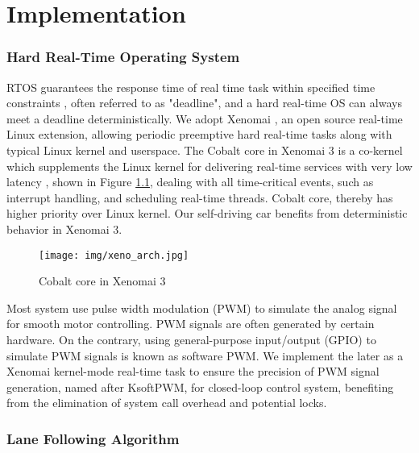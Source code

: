 \newpage
{}
\chapter{Implementation}
\pagestyle{plain}

\begin{spacing}{2.0}

\subsection{Hard Real-Time Operating System}

RTOS guarantees the response time of real time task within specified time constraints \cite{RTOS}, often referred to as "deadline", and a hard real-time OS can always meet a deadline deterministically. We adopt Xenomai \cite{Xenomai}, an open source real-time Linux extension, allowing periodic preemptive hard real-time tasks along with typical Linux kernel and userspace. The Cobalt core in Xenomai 3 is a co-kernel which supplements the Linux kernel for delivering real-time services with very low latency \cite{rtlws2015}, shown in Figure \ref{fig:xeno_arch}, dealing with all time-critical events, such as interrupt handling, and scheduling real-time threads. Cobalt core, thereby has higher priority over Linux kernel. Our self-driving car benefits from deterministic behavior in Xenomai 3.

\begin{figure}
	\centering
	\texttt{[image: img/xeno\_arch.jpg]}
	\caption{Cobalt core in Xenomai 3}
	\label{fig:xeno_arch}
\end{figure}

Most system use pulse width modulation (PWM) to simulate the analog signal for smooth motor controlling. PWM signals are often generated by certain hardware. On the contrary, using general-purpose input/output (GPIO) to simulate PWM signals is known as software PWM. We implement the later as a Xenomai kernel-mode real-time task to ensure the precision of PWM signal generation, named after KsoftPWM, for closed-loop control system, benefiting from the elimination of system call overhead and potential locks.

\subsection{Lane Following Algorithm}


\end{spacing}
